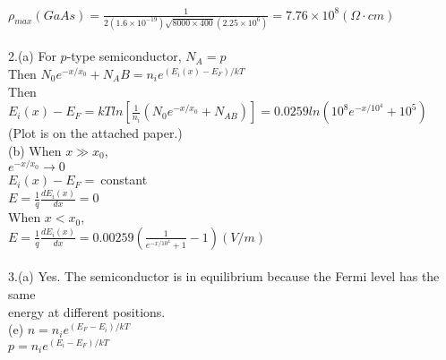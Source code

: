\documentclass[11pt,oneside,a4paper]{article}
\begin{document}
\hspace{8.5mm} \(\rho_{max}(GaAs)=\frac{1}{2(1.6\times10^{-19})\sqrt{8000\times400}(2.25\times10^6)}=7.76\times10^8 (\Omega\cdot cm)\) \\
\\ 

2.\:(a) For \(p\)-type semiconductor, \(N_A=p\) \\

\hspace{8.5mm} Then \(N_0e^{-x/x_0}+N_AB=n_ie^{(E_i(x)-E_F)/kT}\) \\

\hspace{8.5mm} Then \(E_i(x)-E_F=kTln[\frac{1}{n_i}(N_0e^{-x/x_0}+N_{AB})]=0.0259ln(10^8e^{-x/10^4}+10^5)\) \\

\hspace{8.5mm} (Plot is on the attached paper.) \\

\quad (b) When \(x\gg x_0\), \\

\hspace{8.5mm} \(e^{-x/x_0}\rightarrow0\) \\

\hspace{8.5mm} \(E_i(x)-E_F=\ \)constant \\

\hspace{8.5mm} \(E=\frac{1}{q}\frac{dE_i(x)}{dx}=0\) \\

\hspace{8.5mm} When \(x<x_0\), \\

\hspace{8.5mm} \(E=\frac{1}{q}\frac{dE_i(x)}{dx}=0.00259(\frac{1}{e^{-x/10^4}+1}-1) (V/m)\) \\
\\

3.\:(a) Yes. The semiconductor is in equilibrium because the Fermi level has the same \\

\quad energy at different positions. \\

\quad (e) \(n=n_ie^{(E_F-E_i)/kT}\) \\

\hspace{8.5mm} \(p=n_ie^{(E_i-E_F)/kT}\) \\
\end{document}
